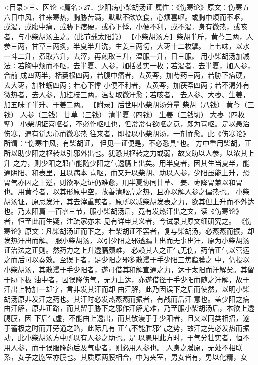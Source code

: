 \documentclass[a4paper,12pt,UTF8,twoside]{ctexbook}
\begin{document}
<目录>三、医论
<篇名>27．少阳病小柴胡汤证
属性：《伤寒论》原文∶伤寒五六日中风，往来寒热，胸胁苦满，默默不欲饮食，心烦喜呕。或胸中烦而不呕， 
或渴，或腹中痛，或胁下痞硬，或心下悸，小便不利，或不渴，身有微热，或咳者，与小柴胡汤主之。（此节载太阳篇） 
【小柴胡汤方】柴胡半斤，黄芩三两，人参三两，甘草三两炙，半夏半升洗，生姜三两切，大枣十二枚擘。 
上七味，以水一斗二升，煮取六升，去滓，再煎取三升，温服一升，日三服。 
用小柴胡汤加减法∶若胸中烦而不呕，去半夏、人参，加栝蒌实一枚；若渴者，去半夏，加人参，合前 
成四两半，栝蒌根四两，若腹中痛者，去黄芩，加芍药三两，若胁下痞硬，去大枣，加牡蛎四两；若心下悸 
小便不利者，去黄芩，加茯苓四两；若不渴外有微热者，去人参，加桂枝三两，温复取微汗愈；若咳者， 
去人参、大枣、生姜，加五味子半升、干姜二两。 
【附录】后世用小柴胡汤分量 
柴胡（八钱） 黄芩（三钱） 人参（三钱） 甘草（三钱） 
清半夏（四钱） 生姜（三钱切） 大枣（四枚擘） 
小柴胡证喜呕者，不必作呕吐也，但常常有欲呕之意，即为喜呕。是以愚治伤寒，遇有觉恶心而微寒热 
往来者，即投以小柴胡汤，一剂而愈。此《伤寒论》所谓∶“伤寒中风，有柴胡证， 
但见一证便是，不必悉具”也。 
方中重用柴胡，正所以助少阳之枢转以引邪外出也。犹恐其枢转之力或弱，故又助以人参，以浓其上升 
之力，则少阳之邪直能随少阳之气透膈上出矣。用半夏者，因其生当夏半，能通阴阳、和表里，且以病本 
喜呕，而又升以柴胡、助以人参，少阳虽能上升，恐胃气亦因之上逆，则欲呕之证仍难愈，用半夏协同甘草、 
姜、枣降胃兼以和胃也。用黄芩者，以其形原中空，故善清躯壳之热，且亦以解人参之偏热也。 
小柴胡汤证，原忌发汗，其去滓重煎者，原所以减柴胡发表之力，欲其但上升而不外达也。乃太阳篇 
一百零三节，服小柴胡汤后，竟有发热汗出之文，读《伤寒论》者，恒至此而生疑，注疏家亦未 
见有详申其义者，今试录其原文细研究之。 
《伤寒论》原文∶凡柴胡汤证而下之，若柴胡证不罢者，复与柴胡汤，必蒸蒸而振，却发热汗出而解。 
服小柴胡汤，以引少阳之邪透膈上出而无事出汗，原为小柴胡汤证治法之正则。然药力之上升透膈颇难， 
必赖其人之正气无伤，药借正气以营运之而后可以奏效。至误下者，足少阳之邪多散漫于手少阳三焦脂膜之 
中，仍投以小柴胡汤，其散漫于手少阳者，遂可借其和解宣通之力，达于太阳而汗解矣。其留于胁下板 
油中者，因误降伤气，无力上达，亦遂借径于手少阳而随之汗解，故于汗出上特加一却字，言非发其汗而却 
由汗解，此乃因误下之后而使然，以明小柴胡汤原非发汗之药也。其汗时必发热蒸蒸而振者，有战而后汗 
意也。盖少阳之病由汗解，原非正路，而其留于胁下之邪作汗解尤难，乃至服小柴胡汤后，本欲上透膈膜，因 
下后气虚，不能由上透出，而其散漫于手少阳者，且又以同类相招，遂于蓄极之时而开旁通之路，此际几有 
正气不能胜邪气之势，故汗之先必发热而振动，此小柴胡汤方中所以有人参之助也。是 
以愚用此方时，于气分壮实者，恒不用人参，而于误服降药后及气虚者，则必用人参也。 
人身之膜原，无处不相联系，女子之胞室亦膜也。其质原两膜相合，中为夹室，男女皆有，男以化精，女 
\end{document}
